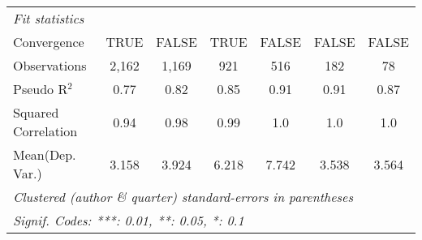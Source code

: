 \begin{tabular}{lcccccc}
   \midrule
   \emph{Fit statistics}\\
   Convergence                                                &TRUE          & FALSE       & TRUE        & FALSE      & FALSE          & FALSE\\  
   Observations                                               & 2,162        & 1,169       & 921         & 516        & 182            & 78\\  
   Pseudo R$^2$                                               & 0.77         & 0.82        & 0.85        & 0.91       & 0.91           & 0.87\\  
   Squared Correlation                                        & 0.94         & 0.98        & 0.99        & 1.0        & 1.0            & 1.0\\  
Mean(Dep. Var.) & 3.158 & 3.924 & 6.218 & 7.742 & 3.538 & 3.564 \\
   \midrule \midrule
   \multicolumn{7}{l}{\emph{Clustered (author \& quarter) standard-errors in parentheses}}\\
   \multicolumn{7}{l}{\emph{Signif. Codes: ***: 0.01, **: 0.05, *: 0.1}}\\
\end{tabular}
\par\endgroup
